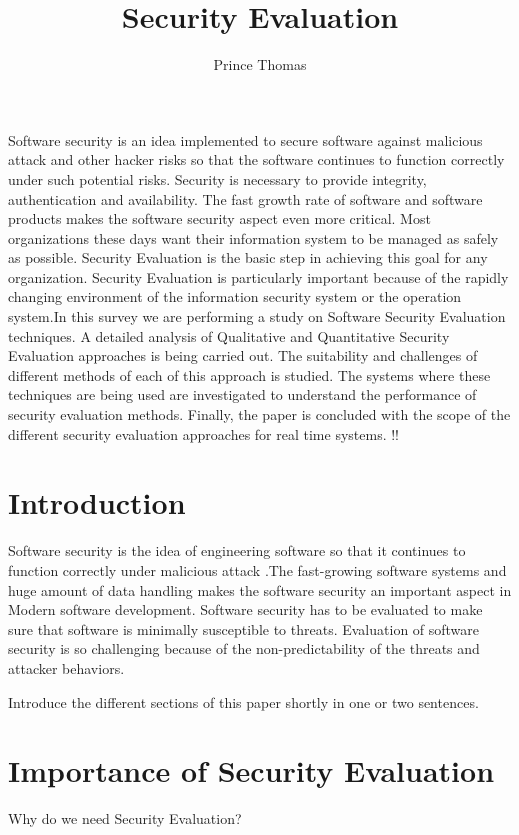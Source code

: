 \documentclass[pdftex,english,oribibl]{llncs}
\title{Security Evaluation}
\author{Prince Thomas}
\institute{University of Stuttgart\\Institute of Software Technology (ISTE)\\70569 Stuttgart, Germany}
\makeatletter
\gdef\@keywords{}
\renewenvironment{abstract}{%
  \list{}{\advance\topsep by0.35cm\relax\small%
          \leftmargin=1cm%
          \labelwidth=\z@%
          \listparindent=\z@%
          \itemindent\listparindent%
          \rightmargin\leftmargin}%
          \item[\hskip\labelsep\bfseries\abstractname]}{%
  \if!\@keywords!\else{\item[~]\item[\hskip\labelsep\bfseries\keywordname]\@keywords}\fi%
  \endlist}
\makeatother
\begin{document}
\maketitle

\begin{abstract}
Software security is an idea implemented to secure software against malicious attack and other hacker risks so that the software continues to function correctly under such potential risks. Security is necessary to provide integrity, authentication and availability. The fast growth rate of software and software products makes the software security aspect even more critical. Most organizations these days want their information system to be managed as safely as possible. Security Evaluation is the basic step in achieving this goal for any organization. Security Evaluation is particularly important because of the rapidly changing environment of the information security system or the operation system.In this survey we are performing a study on Software Security Evaluation techniques. A detailed analysis of Qualitative and Quantitative Security Evaluation approaches is being carried out. The suitability and challenges of different methods of each of this approach is studied. The systems where these techniques are being used are investigated to understand the performance of security evaluation methods. Finally, the paper is concluded with the scope of the different security evaluation approaches for real time systems.
\end{abstract}

\section{Introduction}

  Software security is the idea of engineering software so that it continues to function correctly under malicious attack \cite{1281254} .The fast-growing software systems and huge amount of data handling makes the software security an important aspect in Modern software development. Software security has to be evaluated to make sure that software is minimally susceptible to threats. Evaluation of software security is so challenging because of the non-predictability of the threats and attacker behaviors.

  Introduce the different sections of this paper shortly in one or two sentences.

  
\section{Importance of Security Evaluation}
Why do we need Security Evaluation?
\end{document}
